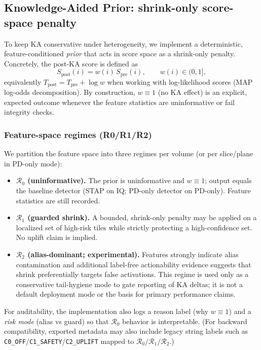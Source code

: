 \subsection{Knowledge-Aided Prior: shrink-only score-space penalty}
\label{app:ka-contract-v2-full}

To keep KA conservative under heterogeneity, we implement a deterministic, feature-conditioned \emph{prior} that acts in score space as a shrink-only penalty. Concretely, the post-KA score is defined as
\[
S_{\mathrm{post}}(i)=w(i)\,S_{\mathrm{pre}}(i),\qquad w(i)\in(0,1],
\]
equivalently $T_{\mathrm{post}}=T_{\mathrm{pre}}+\log w$ when working with log-likelihood scores (MAP log-odds decomposition). By construction, $w\equiv 1$ (no KA effect) is an explicit, expected outcome whenever the feature statistics are uninformative or fail integrity checks.

\subsubsection{Feature-space regimes (R0/R1/R2)}
We partition the feature space into three regimes per volume (or per slice/plane in PD-only mode):
\begin{itemize}[nosep]
  \item \textbf{$\mathcal{R}_0$ (uninformative).} The prior is uninformative and $w\equiv 1$; output equals the baseline detector (STAP on IQ; PD-only detector on PD-only). Feature statistics are still recorded.
  \item \textbf{$\mathcal{R}_1$ (guarded shrink).} A bounded, shrink-only penalty may be applied on a localized set of high-risk tiles while strictly protecting a high-confidence set. No uplift claim is implied.
  \item \textbf{$\mathcal{R}_2$ (alias-dominant; experimental).} Features strongly indicate alias contamination and additional label-free actionability evidence suggests that shrink preferentially targets false activations. This regime is used only as a conservative tail-hygiene mode to gate reporting of KA deltas; it is not a default deployment mode or the basis for primary performance claims.
\end{itemize}
For auditability, the implementation also logs a reason label (why $w\equiv 1$) and a \emph{risk mode} (alias vs guard) so that $\mathcal{R}_0$ behavior is interpretable. (For backward compatibility, exported metadata may also include legacy string labels such as \texttt{C0\_OFF}/\texttt{C1\_SAFETY}/\texttt{C2\_UPLIFT} mapped to $\mathcal{R}_0/\mathcal{R}_1/\mathcal{R}_2$.)

